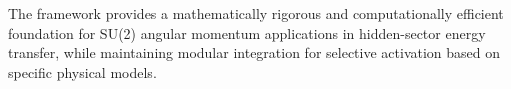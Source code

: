 \documentclass[12pt]{article}
\begin{document}
The framework provides a mathematically rigorous and computationally efficient foundation for SU(2) angular momentum applications in hidden-sector energy transfer, while maintaining modular integration for selective activation based on specific physical models.



\end{document}
